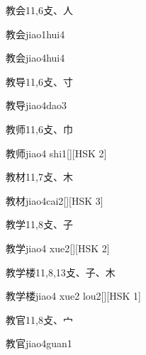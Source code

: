 \begin{entry}{教会}{11,6}{⽁、⼈}
  \begin{phonetics}{教会}{jiao1hui4}
  \end{phonetics}
  \begin{phonetics}{教会}{jiao4hui4}
  \end{phonetics}
\end{entry}

\begin{entry}{教导}{11,6}{⽁、⼨}
  \begin{phonetics}{教导}{jiao4dao3}
  \end{phonetics}
\end{entry}

\begin{entry}{教师}{11,6}{⽁、⼱}
  \begin{phonetics}{教师}{jiao4 shi1}[][HSK 2]
  \end{phonetics}
\end{entry}

\begin{entry}{教材}{11,7}{⽁、⽊}
  \begin{phonetics}{教材}{jiao4cai2}[][HSK 3]
  \end{phonetics}
\end{entry}

\begin{entry}{教学}{11,8}{⽁、⼦}
  \begin{phonetics}{教学}{jiao4 xue2}[][HSK 2]
  \end{phonetics}
\end{entry}

\begin{entry}{教学楼}{11,8,13}{⽁、⼦、⽊}
  \begin{phonetics}{教学楼}{jiao4 xue2 lou2}[][HSK 1]
  \end{phonetics}
\end{entry}

\begin{entry}{教官}{11,8}{⽁、⼧}
  \begin{phonetics}{教官}{jiao4guan1}
  \end{phonetics}
\end{entry}

